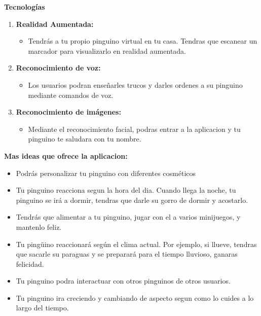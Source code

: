 \documentclass{article}
\begin{document}
\raggedright
\textbf{Tecnologías}
\begin{enumerate}
	\item \textbf{Realidad Aumentada:}
	  \begin{itemize}
		\item Tendrás a tu propio pinguino virtual en tu casa. Tendras que escanear un marcador para visualizarlo en realidad aumentada. 
	  \end{itemize}
  
	\item \textbf{Reconocimiento de voz:}
	  \begin{itemize}
		\item Los usuarios podran enseñarles trucos y darles ordenes a su pinguino mediante comandos de voz.
	  \end{itemize}
  
	\item \textbf{Reconocimiento de imágenes:}
	  \begin{itemize}
		\item Mediante el reconocimiento facial, podras entrar a la aplicacion y tu pinguino te saludara con tu nombre.
	  \end{itemize}
  
  \end{enumerate}

\vspace*{1\baselineskip}


\textbf{Mas ideas que ofrece la aplicacion:}
	\begin{itemize}
	\item Podrás personalizar tu pinguino con diferentes cosméticos
	\item Tu pinguino reacciona segun la hora del dia. Cuando llega la noche, tu pinguino se irá a dormir, tendras que darle su gorro de dormir y acostarlo.
	\item Tendrás que alimentar a tu pinguino, jugar con el a varios minijuegos, y mantenlo feliz.
	\item Tu pingüino reaccionará según el clima actual. Por ejemplo, si llueve, tendras que sacarle su paraguas y se preparará para el tiempo lluvioso, ganaras felicidad.
	\item Tu pinguino podra interactuar con otros pinguinos de otros usuarios.
	\item Tu pinguino ira creciendo y cambiando de aspecto segun como lo cuides a lo largo del tiempo.
  \end{itemize}
\end{document}
